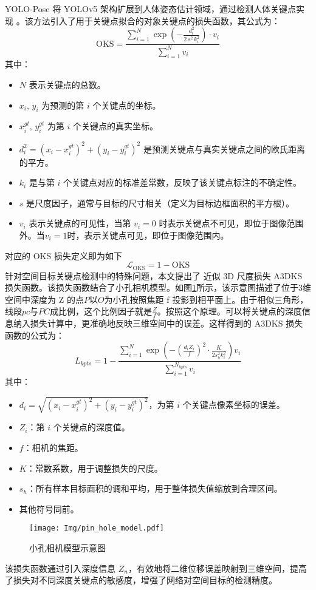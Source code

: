 YOLO-Pose\cite{yolo_pose} 将 YOLOv5 架构扩展到人体姿态估计领域，通过检测人体关键点实现 \citep{yolo_pose}。该方法引入了用于关键点拟合的对象关键点的损失函数，其公式为：
\begin{equation}
	\mathrm{OKS} = \frac{\sum\limits_{i=1}^{N} \exp\left(-\frac{d_i^2}{2\, s^2 \, k_i^2}\right) \cdot v_i}
	{\sum_{i=1}^{N} v_i}
\end{equation}
其中：
\begin{itemize}
	\item $N$ 表示关键点的总数。
	\item $x_i$, $y_i$ 为预测的第 $i$ 个关键点的坐标。
	\item $x_i^{gt}$, $y_i^{gt}$ 为第 $i$ 个关键点的真实坐标。
	\item $d_i^2 = (x_i - x_i^{gt})^2 + (y_i - y_i^{gt})^2$ 是预测关键点与真实关键点之间的欧氏距离的平方。
	\item $k_i$ 是与第 $i$ 个关键点对应的标准差常数，反映了该关键点标注的不确定性。
	\item $s$ 是尺度因子，通常与目标的尺寸相关（定义为目标边框面积的平方根）。
	\item $v_i$ 表示关键点的可见性，当第 $v_i=0$ 时表示关键点不可见，即位于图像范围外。当$v_i=1$时，表示关键点可见，即位于图像范围内。 
\end{itemize}
对应的 OKS 损失定义即为如下
\begin{equation}
	\mathcal{L}_{\text{OKS}} = 1 - \mathrm{OKS}
\end{equation}
针对空间目标关键点检测中的特殊问题，本文提出了 近似 3D 尺度损失 A3DKS 损失函数。该损失函数结合了小孔相机模型。如图\ref{fig:pin_hole_model}所示，该示意图描述了位于3维空间中深度为 Z 的点$P$以$O$为小孔按照焦距 f 投影到相平面上。由于相似三角形，线段$pc$与$PC$成比例，这个比例因子就是$\frac{Z}{f}$。按照这个原理。可以将关键点的深度信息纳入损失计算中，更准确地反映三维空间中的误差。这样得到的 A3DKS 损失函数的公式为：
\begin{equation}
	L_{kpts} = 1 - \frac{\sum\limits_{i=1}^{N} \exp \left( -\left( \frac{d_i Z_i}{f} \right)^2 \cdot \frac{K}{2 s_h^2 k_i^2} \right) v_i}{\sum\limits_{i=1}^{N_{kpts}} v_i}
\end{equation}
其中：
\begin{itemize}
	\item $d_i = \sqrt{(x_i - x_i^{gt})^2 + (y_i - y_i^{gt})^2}$，为第 $i$ 个关键点像素坐标的误差。
	\item $Z_i$：第 $i$ 个关键点的深度值。
	\item $f$：相机的焦距。
	\item $K$：常数系数，用于调整损失的尺度。
	\item $s_h$：所有样本目标面积的调和平均，用于整体损失值缩放到合理区间。
	\item 其他符号同前。
\end{itemize}
\begin{figure}[htbp]
	\centering
	\texttt{[image: Img/pin\_hole\_model.pdf]}
	\caption{小孔相机模型示意图}
	\label{fig:pin_hole_model}
\end{figure}
该损失函数通过引入深度信息 $Z_n$，有效地将二维位移误差映射到三维空间，提高了损失对不同深度关键点的敏感度，增强了网络对空间目标的检测精度。

